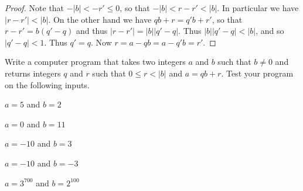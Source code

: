 \begin{proof}
Note that \(-|b| < -r' \leq 0\), so that \(-|b| < r-r' < |b|\).
In particular we have \(|r-r'| < |b|\).
On the other hand we have \(qb+r = q'b+r'\), so that \(r-r' = b(q'-q)\) and thus \(|r-r'| = |b||q'-q|\).
Thus \(|b||q'-q| < |b|\), and so \(|q'-q| < 1\).
Thus \(q' = q\).
Now \(r = a - qb = a - q'b = r'\).
\end{proof}



\Exercises%

\begin{exercise}
Write a computer program that takes two integers \(a\) and \(b\) such that \(b \neq 0\) and returns integers \(q\) and \(r\) such that \(0 \leq r < |b|\) and \(a = qb + r\).
Test your program on the following inputs.
\begin{proplist*}
\item \(a = 5 \) and \(b = 2 \)
\item \(a = 0 \) and \(b = 11 \)
\item \(a = -10 \) and \(b = 3 \)
\item \(a = -10 \) and \(b = -3 \)
\item \(a = 3^{700} \) and \(b = 2^{100} \)
\end{proplist*}
\end{exercise}
